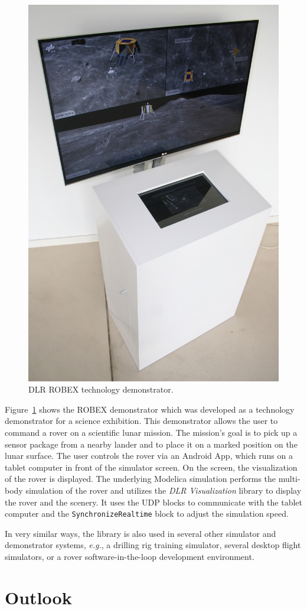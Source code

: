 \documentclass{resources/modelica}
\newcommand{\modelica}[1]{\lstinline[language=modelica]|#1|}
\newcommand{\BTHI}[1]{}
\newcommand{\TBEU}[1]{}
\begin{document}
\begin{figure}[htb]
  \centering
  \includegraphics[width=0.5\columnwidth]{figures/DLRROBEX}
  \caption{DLR ROBEX technology demonstrator.}
  \label{fig:DLRROBEX}
\end{figure}
\TBEU{Tobias: Do you have any citable references for the application or exhibition?}
Figure~\ref{fig:DLRROBEX} shows the ROBEX demonstrator which was developed as a technology demonstrator
for a science exhibition.
This demonstrator allows the user to command a rover
on a scientific lunar mission. The mission's goal is to pick up a sensor package from a nearby
lander and to place it on a marked position on the lunar surface. The user
controls the rover via an Android App, which runs on a tablet computer in front of
the simulator screen.
\TBEU{Bernhard: Add link to Android in footnote?}On the screen, the visualization of the rover is displayed.
The underlying Modelica simulation performs the multi-body simulation of the
rover and utilizes the \emph{DLR Visualization} library to display the rover and the
scenery.
\TBEU{Tobias: Is the Android App open-source and can be added as link in a footnote?}It uses the UDP blocks to communicate with the tablet computer and the
\modelica{SynchronizeRealtime} block to adjust the simulation speed.

In very similar ways, the library is also used in several other simulator and
demonstrator systems, \textit{e.g.}, a drilling rig training simulator, several
desktop flight simulators, or a rover software-in-the-loop development
environment.

\section{Outlook}
\BTHI{TODO: Bernhard, Thomas, Volker}
\end{document}

